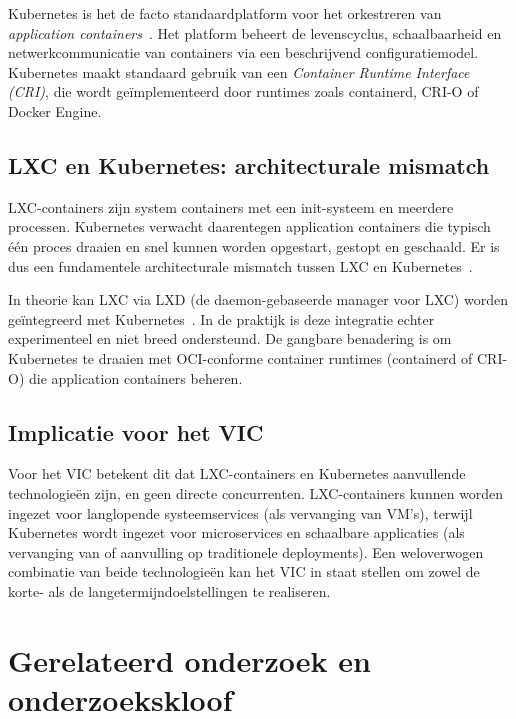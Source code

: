 Kubernetes is het de facto standaardplatform voor het orkestreren van \textit{application containers}~\autocite{IEEE2014Containers}. Het platform beheert de levenscyclus, schaalbaarheid en netwerkcommunicatie van containers via een beschrijvend configuratiemodel. Kubernetes maakt standaard gebruik van een \textit{Container Runtime Interface (CRI)}, die wordt geïmplementeerd door runtimes zoals containerd, CRI-O of Docker Engine.

\subsection{LXC en Kubernetes: architecturale mismatch}
\label{subsec:lxc-kubernetes-mismatch}

LXC-containers zijn system containers met een init-systeem en meerdere processen. Kubernetes verwacht daarentegen application containers die typisch één proces draaien en snel kunnen worden opgestart, gestopt en geschaald. Er is dus een fundamentele architecturale mismatch tussen LXC en Kubernetes~\autocite{IEEE2014Containers}.

In theorie kan LXC via LXD (de daemon-gebaseerde manager voor LXC) worden geïntegreerd met Kubernetes~\autocite{StackOverflow2020}. In de praktijk is deze integratie echter experimenteel en niet breed ondersteund. De gangbare benadering is om Kubernetes te draaien met OCI-conforme container runtimes (containerd of CRI-O) die application containers beheren.

\subsection{Implicatie voor het VIC}
\label{subsec:kubernetes-implicatie}

Voor het VIC betekent dit dat LXC-containers en Kubernetes aanvullende technologieën zijn, en geen directe concurrenten. LXC-containers kunnen worden ingezet voor langlopende systeemservices (als vervanging van VM's), terwijl Kubernetes wordt ingezet voor microservices en schaalbare applicaties (als vervanging van of aanvulling op traditionele deployments). Een weloverwogen combinatie van beide technologieën kan het VIC in staat stellen om zowel de korte- als de langetermijndoelstellingen te realiseren.

\section{Gerelateerd onderzoek en onderzoekskloof}
\label{sec:onderzoekskloof}

